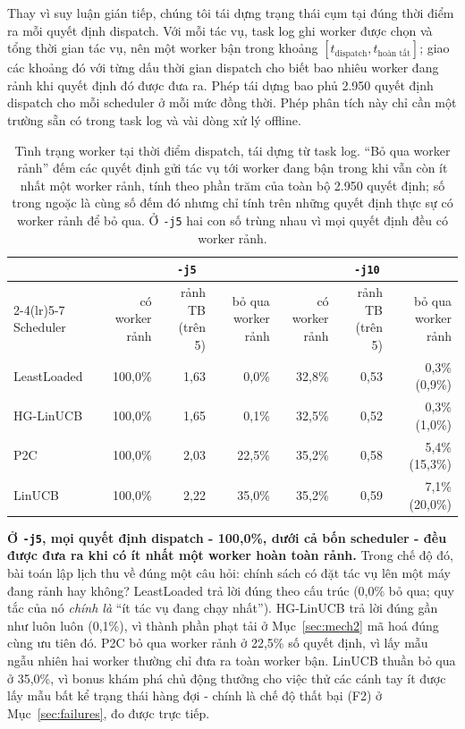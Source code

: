 \documentclass[final,5p,times,twocolumn]{elsarticle}
\begin{document}
Thay vì suy luận gián tiếp, chúng tôi tái dựng trạng thái cụm tại đúng thời điểm ra mỗi quyết định dispatch. Với mỗi tác vụ, task log ghi worker được chọn và tổng thời gian tác vụ, nên một worker bận trong khoảng $[t_{\text{dispatch}},t_{\text{hoàn tất}}]$; giao các khoảng đó với từng dấu thời gian dispatch cho biết bao nhiêu worker đang rảnh khi quyết định đó được đưa ra. Phép tái dựng bao phủ 2.950 quyết định dispatch cho mỗi scheduler ở mỗi mức đồng thời. Phép phân tích này chỉ cần một trường sẵn có trong task log và vài dòng xử lý offline.

\begin{table}[t]
\centering
\caption{Tình trạng worker tại thời điểm dispatch, tái dựng từ task log. ``Bỏ qua worker rảnh'' đếm các quyết định gửi tác vụ tới worker đang bận trong khi vẫn còn ít nhất một worker rảnh, tính theo phần trăm của toàn bộ 2.950 quyết định; số trong ngoặc là cùng số đếm đó nhưng chỉ tính trên những quyết định thực sự có worker rảnh để bỏ qua. Ở \texttt{-j5} hai con số trùng nhau vì mọi quyết định đều có worker rảnh.}
\label{tab:avail}
\small
\begin{tabular}{lrrrrrr}
\toprule
& \multicolumn{3}{c}{\texttt{-j5}} & \multicolumn{3}{c}{\texttt{-j10}} \\
\cmidrule(lr){2-4}\cmidrule(lr){5-7}
Scheduler & có worker rảnh & rảnh TB (trên 5) & bỏ qua worker rảnh & có worker rảnh & rảnh TB (trên 5) & bỏ qua worker rảnh \\
\midrule
LeastLoaded & 100,0\% & 1,63 & 0,0\% & 32,8\% & 0,53 & 0,3\% (0,9\%) \\
HG-LinUCB & 100,0\% & 1,65 & 0,1\% & 32,5\% & 0,52 & 0,3\% (1,0\%) \\
P2C & 100,0\% & 2,03 & 22,5\% & 35,2\% & 0,58 & 5,4\% (15,3\%) \\
LinUCB & 100,0\% & 2,22 & 35,0\% & 35,2\% & 0,59 & 7,1\% (20,0\%) \\
\bottomrule
\end{tabular}
\end{table}

\textbf{Ở \texttt{-j5}, mọi quyết định dispatch - 100,0\%, dưới cả bốn scheduler - đều được đưa ra khi có ít nhất một worker hoàn toàn rảnh.} Trong chế độ đó, bài toán lập lịch thu về đúng một câu hỏi: chính sách có đặt tác vụ lên một máy đang rảnh hay không? LeastLoaded trả lời đúng theo cấu trúc (0,0\% bỏ qua; quy tắc của nó \emph{chính là} ``ít tác vụ đang chạy nhất''). HG-LinUCB trả lời đúng gần như luôn luôn (0,1\%), vì thành phần phạt tải ở Mục~\ref{sec:mech2} mã hoá đúng cùng ưu tiên đó. P2C bỏ qua worker rảnh ở 22,5\% số quyết định, vì lấy mẫu ngẫu nhiên hai worker thường chỉ đưa ra toàn worker bận. LinUCB thuần bỏ qua ở 35,0\%, vì bonus khám phá chủ động thưởng cho việc thử các cánh tay ít được lấy mẫu bất kể trạng thái hàng đợi - chính là chế độ thất bại (F2) ở Mục~\ref{sec:failures}, đo được trực tiếp.
\end{document}
